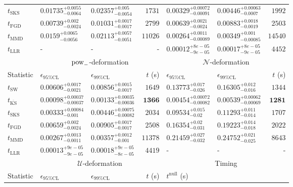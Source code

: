 \begin{tabular}{l|llr|llr}
	$t_{\mathrm{SKS}}$ & $0.01735_{-0.0064}^{+0.0055}$ & $0.02357_{-0.0054}^{+0.005}$ & $1731$ & $0.00329_{-0.00091}^{+0.00072}$ & $0.00446_{-0.0007}^{+0.00063}$ & $1992$ \\
	$t_{\mathrm{FGD}}$ & ${\mathbf{0.00739_{-0.0024}^{+0.002}}}$ & ${\mathbf{0.01031_{-0.0017}^{+0.0017}}}$ & $2799$ & $0.00639_{-0.0024}^{+0.0021}$ & $0.00883_{-0.0019}^{+0.0018}$ & $2503$ \\
	$t_{\mathrm{MMD}}$ & $0.0159_{-0.0056}^{+0.0065}$ & $0.02113_{-0.0051}^{+0.0057}$ & $11026$ & $0.00264_{-0.00089}^{+0.0011}$ & $0.00349_{-0.00085}^{+0.001}$ & $14540$ \\
	$t_{\mathrm{LLR}}$ & - & - & - & $0.00012_{-9e-05}^{+8e-05}$ & $0.00017_{-9e-05}^{+8e-05}$ & $4452$ \\
	\toprule
	\multicolumn{1}{c}{} & \multicolumn{3}{c}{$\rm{pow}_{-}$-deformation} & \multicolumn{3}{c}{$\mathcal{N}$-deformation} \\
	Statistic & $\epsilon_{95\%\mathrm{CL}}$ & $\epsilon_{99\%\mathrm{CL}}$ & $t$ (s) & $\epsilon_{95\%\mathrm{CL}}$ & $\epsilon_{99\%\mathrm{CL}}$ & $t$ (s) \\
	\midrule
	$t_{\mathrm{SW}}$ & $0.00606_{-0.0021}^{+0.0017}$ & $0.00856_{-0.0017}^{+0.0015}$ & $1649$ & $0.13773_{-0.026}^{+0.017}$ & $0.16305_{-0.016}^{+0.012}$ & $1344$ \\
	$t_{\overline{\mathrm{KS}}}$ & ${\mathbf{0.00098_{-0.00037}^{+0.00037}}}$ & ${\mathbf{0.00133_{-0.00036}^{+0.00035}}}$ & ${\mathbf{1366}}$ & ${\mathbf{0.00454_{-0.00082}^{+0.00072}}}$ & ${\mathbf{0.00539_{-0.00069}^{+0.00062}}}$ & ${\mathbf{1281}}$ \\
	$t_{\mathrm{SKS}}$ & $0.00333_{-0.001}^{+0.00084}$ & $0.00446_{-0.00082}^{+0.00075}$ & $2034$ & $0.09534_{-0.02}^{+0.015}$ & $0.11293_{-0.014}^{+0.011}$ & $1707$ \\
	$t_{\mathrm{FGD}}$ & $0.00659_{-0.0024}^{+0.002}$ & $0.00905_{-0.0017}^{+0.0017}$ & $2508$ & $0.16354_{-0.031}^{+0.02}$ & $0.19223_{-0.018}^{+0.014}$ & $2022$ \\
	$t_{\mathrm{MMD}}$ & $0.00267_{-0.0011}^{+0.0013}$ & $0.00357_{-0.001}^{+0.0012}$ & $11378$ & $0.21459_{-0.032}^{+0.027}$ & $0.24752_{-0.025}^{+0.021}$ & $8643$ \\
	$t_{\mathrm{LLR}}$ & $0.00013_{-9e-05}^{+9e-05}$ & $0.00018_{-8e-05}^{+9e-05}$ & $4419$ & - & - & - \\
	\toprule
	\multicolumn{1}{c}{} & \multicolumn{3}{c}{$\mathcal{U}$-deformation} & \multicolumn{3}{c}{Timing} \\
	Statistic & $\epsilon_{95\%\mathrm{CL}}$ & $\epsilon_{99\%\mathrm{CL}}$ & $t$ (s) & $t^{\mathrm{null}}$ (s) \\

\end{tabular}
